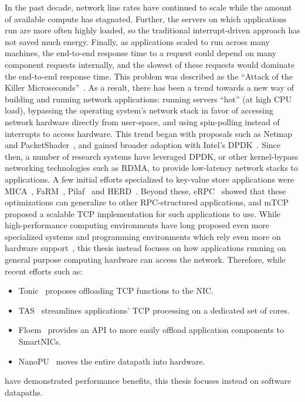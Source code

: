 In the past decade, network line rates have continued to scale while the amount of available compute has stagnated. Further, the servers on which applications run are more often highly loaded, so the traditional interrupt-driven approach has not saved much energy. Finally, as applications scaled to run across many machines, the end-to-end response time to a request could depend on many component requests internally, and the slowest of these requests would dominate the end-to-end response time.
This problem was described as the ``Attack of the Killer Microseconds''~\cite{killer-microseconds}.
As a result, there has been a trend towards a new way of building and running network applications: running servers ``hot'' (\ie at high CPU load), bypassing the operating system's network stack in favor of accessing network hardware directly from user-space, and using spin-polling instead of interrupts to access hardware. 
This trend began with proposals such as Netmap~\cite{netmap} and PacketShader~\cite{packetshader}, and gained broader adoption with Intel's DPDK~\cite{dpdk}.
Since then, a number of research systems have leveraged DPDK, or other kernel-bypass networking technologies such as RDMA, to provide low-latency network stacks to applications. A few initial efforts specialized to key-value store applications were MICA~\cite{mica}, FaRM~\cite{farm}, Pilaf~\cite{pilaf} and HERD~\cite{herd}.
Beyond these, eRPC~\cite{erpc} showed that these optimizations can generalize to other RPC-structured applications, and mTCP~\cite{mtcp} proposed a scalable TCP implementation for such applications to use.
While high-performance computing environments have long proposed even more specialized systems and programming environments which rely even more on hardware support~\cite{pgas, pgas2, pgas3}, this thesis instead focuses on how applications running on general purpose computing hardware can access the network.
Therefore, while recent efforts such as:
\begin{itemize}
    \item Tonic~\cite{tonic} proposes offloading TCP functions to the NIC.
    \item TAS~\cite{tas} streamlines applications' TCP processing on a dedicated set of cores.
    \item Floem~\cite{floem} provides an API to more easily offload application components to SmartNICs.
    \item NanoPU~\cite{nanopu} moves the entire datapath into hardware.
\end{itemize}
have demonstrated performance benefits, this thesis focuses instead on software datapaths.

